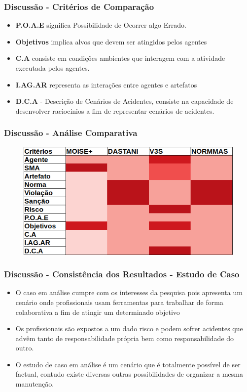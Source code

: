 \documentclass{beamer}
\begin{document}
\begin{frame}
	\frametitle{Discussão - Critérios de Comparação}
	\begin{itemize}
		\item \textbf{P.O.A.E} significa Possibilidade de Ocorrer algo Errado.
		\item \textbf{Objetivos} implica alvos que devem ser atingidos pelos agentes 
		\item \textbf{C.A} consiste em condições ambientes que interagem com a atividade executada pelos agentes.
		\item \textbf{I.AG.AR} representa as interações entre agentes e artefatos
		\item \textbf{D.C.A} - Descrição de Cenários de Acidentes, consiste na capacidade de desenvolver raciocínios a fim de representar cenários de acidentes.
	\end{itemize}
\end{frame}

\begin{frame}
	\frametitle{Discussão - Análise Comparativa}
	\begin{figure}[H]
		\centering
		\includegraphics[width=1\linewidth]{figure/table_head.png} 
		\label{classdiagrama}
	\end{figure}
\end{frame}

\begin{frame}
	\frametitle{Discussão - Consistência dos Resultados - Estudo de Caso}
	\begin{itemize}
		\item  O caso em análise cumpre com os interesses da pesquisa pois apresenta um cenário onde profissionais usam ferramentas para trabalhar de forma colaborativa a fim de atingir um determinado objetivo
		\item Os profissionais são expostos a um dado risco e podem sofrer acidentes que advêm tanto de responsabilidade própria bem como responsabilidade do outro.
		\item O estudo de caso em análise é um cenário que é totalmente possível de ser factual, contudo existe diversas outras possibilidades de organizar a mesma manutenção.
	\end{itemize}
\end{frame}
\end{document}
